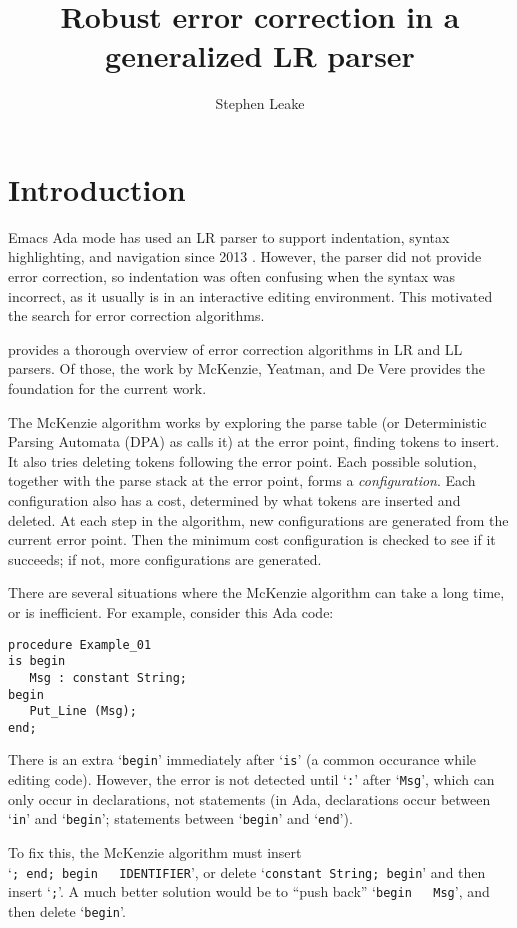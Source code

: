 \documentclass[authordraft]{acmart}
\title{Robust error correction in a generalized LR parser}
\author{Stephen Leake}
\affiliation{retired}
\newcommand{\code}[1]{`\lstinline|#1|'}
\begin{document}
\maketitle
\section{Introduction}
Emacs Ada mode has used an LR parser to support indentation, syntax
highlighting, and navigation since 2013 \citep{Emacs Ada mode news}.
However, the parser did not provide error correction, so indentation
was often confusing when the syntax was incorrect, as it usually is in
an interactive editing environment. This motivated the search for
error correction algorithms.

\citet{Grune 2008} provides a thorough overview of error
correction algorithms in LR and LL parsers. Of those, the work by
McKenzie, Yeatman, and De Vere \citep{McKenzie 1995} provides the
foundation for the current work.

The McKenzie algorithm works by exploring the parse table (or
Deterministic Parsing Automata (DPA) as \citet{McKenzie 1995} calls it)
at the error point, finding tokens to insert. It also tries deleting
tokens following the error point. Each possible solution, together
with the parse stack at the error point, forms a
\textit{configuration}. Each configuration also has a cost, determined
by what tokens are inserted and deleted. At each step in the
algorithm, new configurations are generated from the current error
point. Then the minimum cost configuration is checked to see if it
succeeds; if not, more configurations are generated.

There are several situations where the McKenzie algorithm can take a
long time, or is inefficient. For example, consider this Ada code:
\begin{lstlisting}
procedure Example_01
is begin
   Msg : constant String;
begin
   Put_Line (Msg);
end;
\end{lstlisting}

There is an extra \code{begin} immediately after \code{is} (a common
occurance while editing code). However, the error is not detected
until \code{:} after \code{Msg}, which can only occur in declarations,
not statements (in Ada, declarations occur between \code{in} and
\code{begin}; statements between \code{begin} and \code{end}).

To fix this, the McKenzie algorithm must insert\\ \code{; end; begin
  IDENTIFIER}, or delete \code{constant String; begin} and then insert
\code{;}. A much better solution would be to ``push back'' \code{begin
  Msg}, and then delete \code{begin}.
\end{document}
